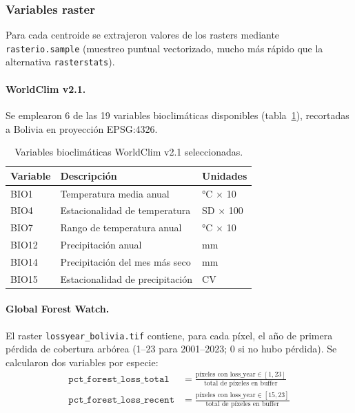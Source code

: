 \documentclass[12pt,a4paper]{article}
\begin{document}
\subsubsection{Variables raster}

Para cada centroide se extrajeron valores de los rasters mediante \texttt{rasterio.sample}
(muestreo puntual vectorizado, mucho más rápido que la alternativa \texttt{rasterstats}).

\paragraph{WorldClim v2.1.}
Se emplearon 6 de las 19 variables bioclimáticas disponibles (tabla~\ref{tab:worldclim}),
recortadas a Bolivia en proyección EPSG:4326.

\begin{table}[H]
  \centering\small
  \caption{Variables bioclimáticas WorldClim v2.1 seleccionadas.}
  \label{tab:worldclim}
  \begin{tabular}{lll}
    \toprule
    \textbf{Variable} & \textbf{Descripción} & \textbf{Unidades} \\
    \midrule
    BIO1  & Temperatura media anual              & °C $\times$ 10 \\
    BIO4  & Estacionalidad de temperatura        & SD $\times$ 100 \\
    BIO7  & Rango de temperatura anual           & °C $\times$ 10 \\
    BIO12 & Precipitación anual                  & mm \\
    BIO14 & Precipitación del mes más seco       & mm \\
    BIO15 & Estacionalidad de precipitación      & CV \\
    \bottomrule
  \end{tabular}
\end{table}

\paragraph{Global Forest Watch.}
El raster \texttt{lossyear\_bolivia.tif} contiene, para cada píxel, el año de primera pérdida
de cobertura arbórea (1--23 para 2001--2023; 0 si no hubo pérdida).
Se calcularon dos variables por especie:
\begin{align}
  \texttt{pct\_forest\_loss\_total} &= \frac{\text{píxeles con loss\_year} \in [1,23]}{\text{total de píxeles en buffer}} \\
  \texttt{pct\_forest\_loss\_recent} &= \frac{\text{píxeles con loss\_year} \in [15,23]}{\text{total de píxeles en buffer}}
\end{align}
\end{document}
